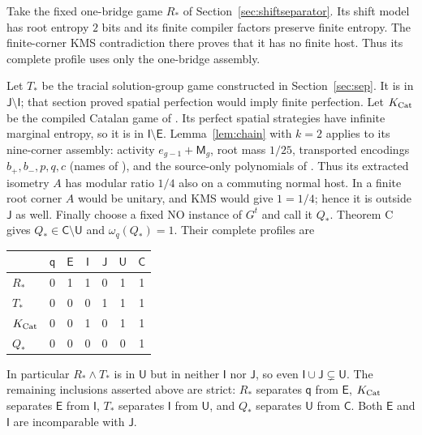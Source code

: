 Take the fixed one-bridge game $R_*$ of Section~\ref{sec:shiftseparator}. Its shift model has root entropy $2$ bits and its finite compiler
factors preserve finite entropy. The finite-corner KMS contradiction
there proves that it has no finite host. Thus its complete profile
uses only the one-bridge assembly.

Let $T_*$ be the tracial solution-group game constructed in
Section~\ref{sec:sep}. It is in $\mathsf J\setminus\mathsf I$;
that section proved spatial perfection would imply finite perfection.
Let $K_{\operatorname{Cat}}$ be the compiled Catalan game of
\cite[Theorem C and Sections 3 and 6]{Entropy}. Its perfect spatial
strategies have infinite marginal entropy, so it is in
$\mathsf I\setminus\mathsf E$. Lemma~\ref{lem:chain} with $k=2$ applies to its nine-corner assembly:
activity $e_{g-1}+\mathsf M_g$, root mass $1/25$, transported encodings
$b_+,b_-,p,q,c$ (names of \cite[Section 6]{Entropy}), and the source-only polynomials of
\cite[Section 6]{Entropy}. Thus its extracted isometry $A$ has
modular ratio $1/4$ also on a commuting normal host. In a finite root corner $A$ would be unitary,
and KMS would give $1=1/4$; hence it is outside $\mathsf J$ as well.
Finally choose a fixed NO instance of $G^t$ and call it $Q_*$.
Theorem C gives $Q_*\in\mathsf C\setminus\mathsf U$ and
$\omega_q(Q_*)=1$. Their complete profiles are
\begin{center}\small
\begin{tabular}{@{}lcccccc@{}}
\toprule & $\mathsf q$ & $\mathsf E$ & $\mathsf I$ & $\mathsf J$ & $\mathsf U$ & $\mathsf C$\\\midrule
$R_*$ &0&1&1&0&1&1\\
$T_*$ &0&0&0&1&1&1\\
$K_{\operatorname{Cat}}$ &0&0&1&0&1&1\\
$Q_*$ &0&0&0&0&0&1\\\bottomrule
\end{tabular}
\end{center}
In particular $R_*\wedge T_*$ is in $\mathsf U$ but in neither
$\mathsf I$ nor $\mathsf J$, so even
$\mathsf I\cup\mathsf J\subsetneq\mathsf U$.
The remaining inclusions asserted above are strict: $R_*$ separates
$\mathsf q$ from $\mathsf E$, $K_{\operatorname{Cat}}$ separates $\mathsf E$
from $\mathsf I$, $T_*$ separates $\mathsf I$ from $\mathsf U$,
and $Q_*$ separates $\mathsf U$ from $\mathsf C$.
Both $\mathsf E$ and $\mathsf I$ are incomparable with $\mathsf J$.

